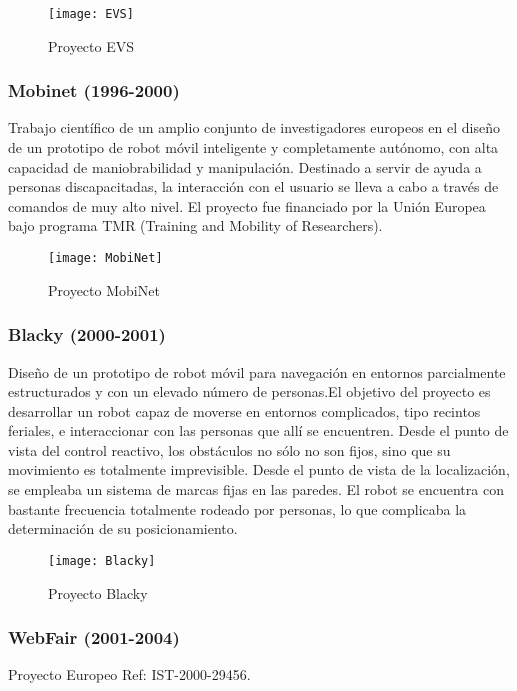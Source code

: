 \begin{figure}[hbt]
  \centering\texttt{[image: EVS]}\\
  \caption{Proyecto EVS}\label{fg:EVS}
\end{figure}


\subsubsection{Mobinet (1996-2000)}
Trabajo científico de un amplio conjunto de investigadores europeos en el diseño de un prototipo de robot móvil inteligente y completamente autónomo, con alta capacidad de maniobrabilidad y manipulación. Destinado a servir de ayuda a personas discapacitadas, la interacción con el usuario se lleva a cabo a través de comandos de muy alto nivel. El proyecto fue financiado por la Unión Europea bajo programa TMR (Training and Mobility of Researchers).

\begin{figure}[hbt]
 \centering\texttt{[image: MobiNet]}\\
  \caption{Proyecto MobiNet}\label{fg:mobinet}
\end{figure}


\subsubsection{Blacky (2000-2001)}
Diseño de un prototipo de robot móvil para navegación en entornos parcialmente estructurados y con un elevado número de personas.El objetivo del proyecto es desarrollar un robot capaz de moverse en entornos complicados, tipo recintos feriales, e interaccionar con las personas que allí se encuentren.
Desde el punto de vista del control reactivo, los obstáculos no sólo no son fijos, sino que su movimiento es
totalmente imprevisible. Desde el punto de vista de la localización, se empleaba un sistema de marcas fijas en las paredes. El robot se encuentra con bastante frecuencia totalmente rodeado por personas, lo que complicaba la determinación de su posicionamiento.

\begin{figure}[h]
  \centering\texttt{[image: Blacky]}\\
  \caption{Proyecto Blacky}\label{fg:blacky}
\end{figure}


\subsubsection{WebFair (2001-2004)}
Proyecto Europeo Ref: IST-2000-29456.


